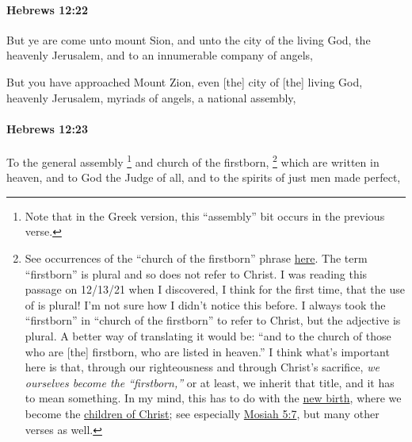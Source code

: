 		\paragraph{Hebrews 12:22} %
			\label{HEBREWS-12-22}

			But ye are come unto mount Sion, and unto the city of the living God, the heavenly Jerusalem, and to an innumerable company of angels,

			\begin{framed}
			\scriptsize
				\begin{compactdesc}
					\item[SBLG] 
					\item[AB 181] But you have approached Mount Zion, even [the] city of [the] living God, heavenly Jerusalem, myriads of angels, a national assembly,
				\end{compactdesc}
			\end{framed}

		\paragraph{Hebrews 12:23} %
			\label{HEBREWS-12-23}

			To the general assembly%
				\footnote{%
					Note that in the Greek version, this ``assembly'' bit occurs in the previous verse.
					}
			and church of the firstborn,%
				\footnote{%
					See occurrences of the ``church of the firstborn'' phrase \hyperref[CHURCH-PHRASES]{here}. The term ``firstborn'' is plural and so does not refer to Christ. I was reading this passage on 12/13/21 when I discovered, I think for the first time, that the use of  is plural! I'm not sure how I didn't notice this before. I always took the ``firstborn'' in ``church of the firstborn'' to refer to Christ, but the adjective is plural. A better way of translating it would be: ``and to the church of those who are [the] firstborn, who are listed in heaven.'' I think what's important here is that, through our righteousness and through Christ's sacrifice, \textit{we ourselves become the ``firstborn,''} or at least, we inherit that title, and it has to mean something. In my mind, this has to do with the \hyperref[NEWBIRTH]{new birth}, where we become the \hyperref[NEWBIRTH-children-christ]{children of Christ}; see especially \hyperref[MOSIAH-5-7]{Mosiah 5:7}, but many other verses as well.
					}
			which are written in heaven, and to God the Judge of all, and to the spirits of just men made perfect,

